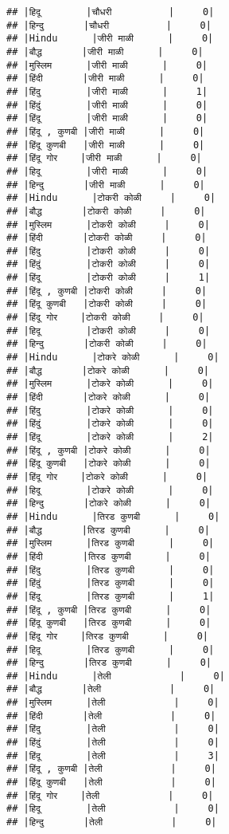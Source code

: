 \documentclass[
]{article}
\begin{document}
\begin{verbatim}
## |हिदू        |चौधरी          |     0|
## |हिन्दु       |चौधरी          |     0|
## |Hindu      |जीरी माळी      |     0|
## |बौद्ध       |जीरी माळी      |     0|
## |मुस्लिम      |जीरी माळी      |     0|
## |हिंदी       |जीरी माळी      |     0|
## |हिंदु        |जीरी माळी      |     1|
## |हिंदुं        |जीरी माळी      |     0|
## |हिंदू        |जीरी माळी      |     0|
## |हिंदू , कुणबी |जीरी माळी      |     0|
## |हिंदू कुणबी   |जीरी माळी      |     0|
## |हिंदू गोर    |जीरी माळी      |     0|
## |हिदू        |जीरी माळी      |     0|
## |हिन्दु       |जीरी माळी      |     0|
## |Hindu      |टोकरी कोळी     |     0|
## |बौद्ध       |टोकरी कोळी     |     0|
## |मुस्लिम      |टोकरी कोळी     |     0|
## |हिंदी       |टोकरी कोळी     |     0|
## |हिंदु        |टोकरी कोळी     |     0|
## |हिंदुं        |टोकरी कोळी     |     0|
## |हिंदू        |टोकरी कोळी     |     1|
## |हिंदू , कुणबी |टोकरी कोळी     |     0|
## |हिंदू कुणबी   |टोकरी कोळी     |     0|
## |हिंदू गोर    |टोकरी कोळी     |     0|
## |हिदू        |टोकरी कोळी     |     0|
## |हिन्दु       |टोकरी कोळी     |     0|
## |Hindu      |टोकरे कोळी      |     0|
## |बौद्ध       |टोकरे कोळी      |     0|
## |मुस्लिम      |टोकरे कोळी      |     0|
## |हिंदी       |टोकरे कोळी      |     0|
## |हिंदु        |टोकरे कोळी      |     0|
## |हिंदुं        |टोकरे कोळी      |     0|
## |हिंदू        |टोकरे कोळी      |     2|
## |हिंदू , कुणबी |टोकरे कोळी      |     0|
## |हिंदू कुणबी   |टोकरे कोळी      |     0|
## |हिंदू गोर    |टोकरे कोळी      |     0|
## |हिदू        |टोकरे कोळी      |     0|
## |हिन्दु       |टोकरे कोळी      |     0|
## |Hindu      |तिरड कुणबी      |     0|
## |बौद्ध       |तिरड कुणबी      |     0|
## |मुस्लिम      |तिरड कुणबी      |     0|
## |हिंदी       |तिरड कुणबी      |     0|
## |हिंदु        |तिरड कुणबी      |     0|
## |हिंदुं        |तिरड कुणबी      |     0|
## |हिंदू        |तिरड कुणबी      |     1|
## |हिंदू , कुणबी |तिरड कुणबी      |     0|
## |हिंदू कुणबी   |तिरड कुणबी      |     0|
## |हिंदू गोर    |तिरड कुणबी      |     0|
## |हिदू        |तिरड कुणबी      |     0|
## |हिन्दु       |तिरड कुणबी      |     0|
## |Hindu      |तेली            |     0|
## |बौद्ध       |तेली            |     0|
## |मुस्लिम      |तेली            |     0|
## |हिंदी       |तेली            |     0|
## |हिंदु        |तेली            |     0|
## |हिंदुं        |तेली            |     0|
## |हिंदू        |तेली            |     3|
## |हिंदू , कुणबी |तेली            |     0|
## |हिंदू कुणबी   |तेली            |     0|
## |हिंदू गोर    |तेली            |     0|
## |हिदू        |तेली            |     0|
## |हिन्दु       |तेली            |     0|

\end{verbatim}
\end{document}
